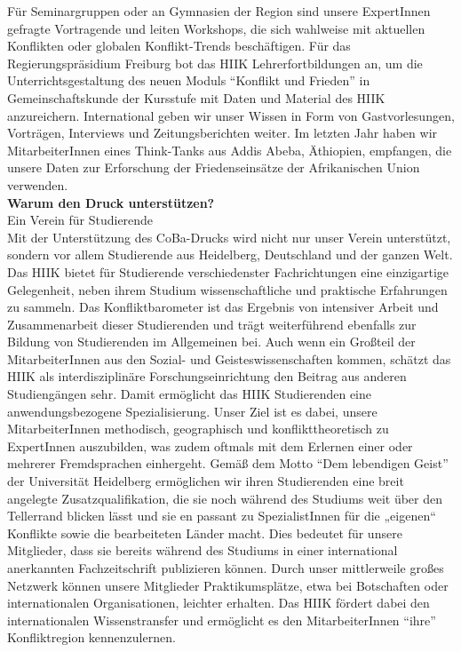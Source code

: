 {    Für Seminargruppen oder an Gymnasien der Region sind unsere ExpertInnen gefragte Vortragende und leiten Workshops, die sich wahlweise mit aktuellen Konflikten oder globalen Konflikt-Trends beschäftigen. Für das Regierungspräsidium Freiburg bot das HIIK Lehrerfortbildungen an, um die Unterrichtsgestaltung des neuen Moduls “Konflikt und Frieden” in Gemeinschaftskunde der Kursstufe mit Daten und Material des HIIK anzureichern. International geben wir unser Wissen in Form von Gastvorlesungen, Vorträgen, Interviews und Zeitungsberichten weiter. Im letzten Jahr haben wir MitarbeiterInnen eines Think-Tanks aus Addis Abeba, Äthiopien, empfangen, die unsere Daten zur Erforschung der Friedenseinsätze der Afrikanischen Union verwenden.\\[1em]
    \textbf{Warum den Druck unterstützen?}\\
    Ein Verein für Studierende\\
    Mit der Unterstützung des CoBa-Drucks wird nicht nur unser Verein unterstützt, sondern vor allem Studierende aus Heidelberg, Deutschland und der ganzen Welt. Das HIIK bietet für Studierende verschiedenster Fachrichtungen eine einzigartige Gelegenheit, neben ihrem Studium wissenschaftliche und praktische Erfahrungen zu sammeln. Das Konfliktbarometer ist das Ergebnis von intensiver Arbeit und Zusammenarbeit dieser Studierenden und trägt weiterführend ebenfalls zur Bildung von Studierenden im Allgemeinen bei. Auch wenn ein Großteil der MitarbeiterInnen aus den Sozial- und Geisteswissenschaften kommen, schätzt das HIIK als interdisziplinäre Forschungseinrichtung den Beitrag aus anderen Studiengängen sehr. Damit ermöglicht das HIIK Studierenden eine anwendungsbezogene Spezialisierung. Unser Ziel ist es dabei, unsere MitarbeiterInnen methodisch, geographisch und konflikttheoretisch zu ExpertInnen auszubilden, was zudem oftmals mit dem Erlernen einer oder mehrerer Fremdsprachen einhergeht. Gemäß dem Motto “Dem lebendigen Geist” der Universität Heidelberg ermöglichen wir ihren Studierenden eine breit angelegte Zusatzqualifikation, die sie noch während des Studiums weit über den Tellerrand blicken lässt und sie en passant zu SpezialistInnen für die „eigenen“ Konflikte sowie die bearbeiteten Länder macht. Dies bedeutet für unsere Mitglieder, dass sie bereits während des Studiums in einer international anerkannten Fachzeitschrift publizieren können. Durch unser mittlerweile großes Netzwerk können unsere Mitglieder Praktikumsplätze, etwa bei Botschaften oder internationalen Organisationen, leichter erhalten. Das HIIK fördert dabei den internationalen Wissenstransfer und ermöglicht es den MitarbeiterInnen “ihre” Konfliktregion kennenzulernen.\\
}
